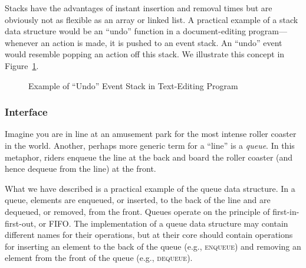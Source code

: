 Stacks have the advantages of instant insertion and removal times but are obviously not as flexible as an array or linked list. A practical example of a stack data structure would be an ``undo'' function in a document-editing program---whenever an action is made, it is pushed to an event stack. An ``undo'' event would resemble popping an action off this stack. We illustrate this concept in Figure~\ref{fig:stackundo}.

\begin{figure}[ht]
\begin{center}
\end{center}
\caption{Example of ``Undo'' Event Stack in Text-Editing Program}
\label{fig:stackundo}
\end{figure}

\subsubsection*{ Interface}
Imagine you are in line at an amusement park for the most intense roller coaster in the world. Another, perhaps more generic term for a ``line'' is a \textit{queue}. In this metaphor, riders enqueue the line at the back and board the roller coaster (and hence dequeue from the line) at the front. 

What we have described is a practical example of the queue data structure. In a queue, elements are enqueued, or inserted, to the back of the line and are dequeued, or removed, from the front. Queues operate on the principle of first-in-first-out, or FIFO. The implementation of a queue data structure may contain different names for their operations, but at their core should contain operations for inserting an element to the back of the queue (e.g., \textsc{enqueue}) and removing an element from the front of the queue (e.g., \textsc{dequeue}). 

